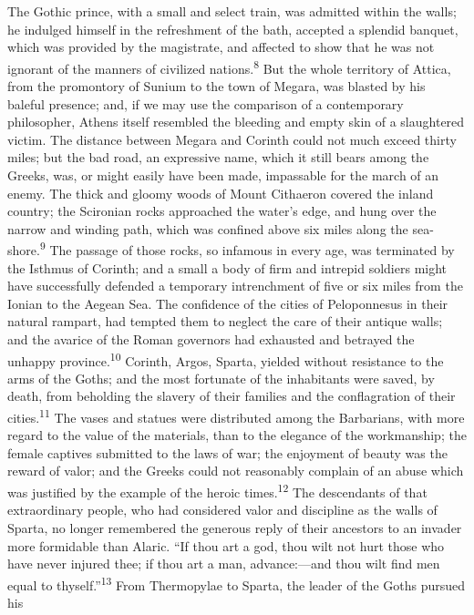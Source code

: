 The Gothic prince, with a small and select train, was admitted
within the walls; he indulged himself in the refreshment of the
bath, accepted a splendid banquet, which was provided by the
magistrate, and affected to show that he was not ignorant of the
manners of civilized nations.\textsuperscript{8} But the whole territory of
Attica, from the promontory of Sunium to the town of Megara, was
blasted by his baleful presence; and, if we may use the
comparison of a contemporary philosopher, Athens itself resembled
the bleeding and empty skin of a slaughtered victim. The distance
between Megara and Corinth could not much exceed thirty miles;
but the bad road, an expressive name, which it still bears among
the Greeks, was, or might easily have been made, impassable for
the march of an enemy. The thick and gloomy woods of Mount
Cithaeron covered the inland country; the Scironian rocks
approached the water’s edge, and hung over the narrow and winding
path, which was confined above six miles along the sea-shore.\textsuperscript{9}
The passage of those rocks, so infamous in every age, was
terminated by the Isthmus of Corinth; and a small a body of firm
and intrepid soldiers might have successfully defended a
temporary intrenchment of five or six miles from the Ionian to
the Aegean Sea. The confidence of the cities of Peloponnesus in
their natural rampart, had tempted them to neglect the care of
their antique walls; and the avarice of the Roman governors had
exhausted and betrayed the unhappy province.\textsuperscript{10} Corinth, Argos,
Sparta, yielded without resistance to the arms of the Goths; and
the most fortunate of the inhabitants were saved, by death, from
beholding the slavery of their families and the conflagration of
their cities.\textsuperscript{11} The vases and statues were distributed among the
Barbarians, with more regard to the value of the materials, than
to the elegance of the workmanship; the female captives submitted
to the laws of war; the enjoyment of beauty was the reward of
valor; and the Greeks could not reasonably complain of an abuse
which was justified by the example of the heroic times.\textsuperscript{12} The
descendants of that extraordinary people, who had considered
valor and discipline as the walls of Sparta, no longer remembered
the generous reply of their ancestors to an invader more
formidable than Alaric. “If thou art a god, thou wilt not hurt
those who have never injured thee; if thou art a man,
advance:—and thou wilt find men equal to thyself.”\textsuperscript{13} From
Thermopylae to Sparta, the leader of the Goths pursued his
